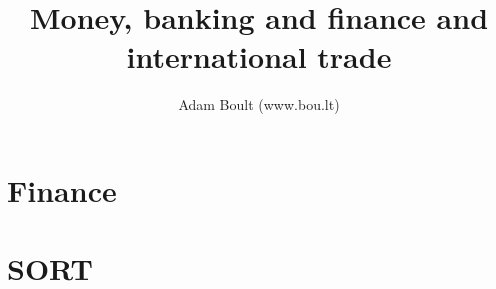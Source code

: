 \documentclass[oneside]{book}
\begin{document}
\author{Adam Boult (www.bou.lt)}
\title{Money, banking and finance and international trade}
\maketitle

\setcounter{tocdepth}{0}
\tableofcontents



\part{Finance}






\part{SORT}

\end{document}
